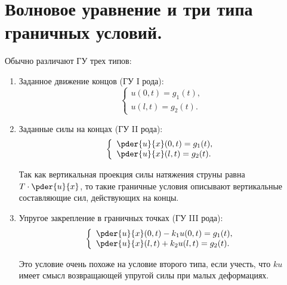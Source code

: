 \chapter{Волновое уравнение и три типа граничных условий.}

Обычно различают ГУ трех типов:
\begin{enumerate}
    \item Заданное движение концов (ГУ I рода):
    \[
        \left\{ \begin{array}{l}
            u(0, t) = g_1(t), \\
            u(l, t) = g_2(t).
        \end{array} \right.
    \]
    
    \item Заданные силы на концах (ГУ II рода):
    \[
        \left\{ \begin{array}{l}
            \ds \pder{u}{x}(0, t) = g_1(t), \\
            \ds \pder{u}{x}(l, t) = g_2(t).
        \end{array} \right.
    \]
    
    Так как вертикальная проекция силы натяжения струны равна \( \ds T\cdot
    \pder{u}{x} \), то такие граничные условия описывают вертикальные
    составляющие сил, действующих на концы.
    
    \item Упругое закрепление в граничных точках (ГУ III рода):
    \[
        \left\{ \begin{array}{l}
            \ds \pder{u}{x}(0, t) - k_1u(0, t) = g_1(t), \\
            \ds \pder{u}{x}(l, t) +k_2u(l,t) = g_2(t).
        \end{array} \right.
    \]
    
    Это условие очень похоже на условие второго типа, если учесть, что \( ku \)
    имеет смысл возвращающей упругой силы при малых деформациях.
\end{enumerate}
\newpage
